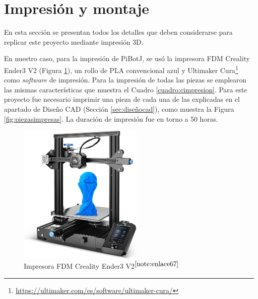 \section{Impresión y montaje}
\label{sec:impresionmontaje}

En esta sección se presentan todos los detalles que deben considerarse para replicar este proyecto mediante impresión 3D. 

En nuestro caso, para la impresión de PiBotJ, se usó la impresora FDM Creality Ender3 V2 (Figura \ref{fig:impresora}), un rollo de PLA convencional azul y Ultimaker Cura\footnote{\url{https://ultimaker.com/es/software/ultimaker-cura/}} como \textit{software} de impresión. Para la impresión de todas las piezas se emplearon las mismas características que muestra el Cuadro \ref{cuadro:cimpresion}. Para este proyecto fue necesario imprimir una pieza de cada una de las explicadas en el apartado de Diseño CAD (Sección \ref{sec:diseñocad}), como muestra la Figura \ref{fig:piezasimpresas}. La duración de impresión fue en torno a 50 horas.
 
\begin{figure} [h!]
	\begin{center}
		\includegraphics[width=6cm]{figs/cap5/impresora.jpg}
	\end{center}
	\caption{Impresora FDM Creality Ender3 V2$^{\ref{note:enlace67}}$} 
	\label{fig:impresora}
\end{figure}

\setcounter{footnote}{67} %

